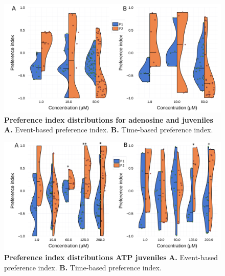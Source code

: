 \begin{appendices}
    \begin{figure}[h]
      \centering
      \includegraphics[width=1\textwidth]{part_2/assets/dist_adenosine.png}
      \caption{\textbf{Preference index distributions for adenosine and juveniles} \textbf{A.} Event-based preference index. \textbf{B.} Time-based preference index. }
      \label{dist_adenosine}
    \end{figure}

    \begin{figure}[h]
      \centering
      \includegraphics[width=1\textwidth]{part_2/assets/dist_atp.png}
      \caption{\textbf{Preference index distributions ATP juveniles} \textbf{A.} Event-based preference index. \textbf{B.} Time-based preference index. }
      \label{dist_atp}
    \end{figure}

\end{appendices}
